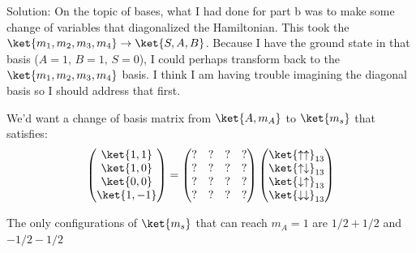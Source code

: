 \begin{homeworkProblem}
\begin{enumerate}[a.]
\begin{callout}{Solution:}
            On the topic of bases, what I had done for part b was to make some change of variables that diagonalized the Hamiltonian. This took the $\ket{m_{1},m_{2},m_{3},m_{4}} \to \ket{S, A, B}$. Because I have the ground state in that basis ($A=1,\,B=1,\,S=0$), I could perhaps transform back to the $\ket{m_{1},m_{2},m_{3},m_{4}}$ basis. I think I am having trouble imagining the diagonal basis so I should address that first. 


            We'd want a change of basis matrix from $\ket{A,m_A}$ to $\ket{m_s}$ that satisfies:
            \begin{align*}
                \begin{pmatrix} \ket{1, 1} \\ \ket{1, 0} \\ \ket{0, 0} \\ \ket{1, -1} \end{pmatrix} =\begin{pmatrix} ? & ? & ? & ? \\ ? & ? & ? & ? \\ ? & ? & ? & ? \\ ? & ? & ? & ? \end{pmatrix}\begin{pmatrix} \ket{\uparrow\uparrow}_{13} \\ \ket{\uparrow\downarrow}_{13} \\ \ket{\downarrow\uparrow}_{13} \\ \ket{\downarrow\downarrow}_{13} \end{pmatrix}
            \end{align*}

            The only configurations of $\ket{m_s}$ that can reach $m_A=1$ are $1/2 + 1/2$ and $-1/2 - 1/2$


\end{callout}
\end{enumerate}
\end{homeworkProblem}

